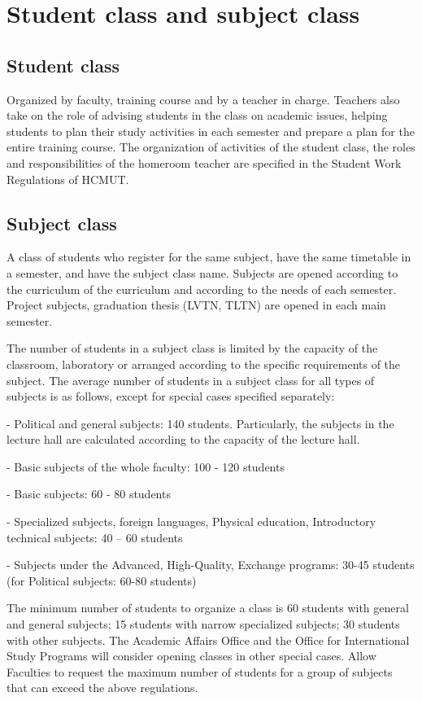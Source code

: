 \section{Student class and subject class}
\subsection{Student class}
Organized by faculty, training course and by a teacher in charge. Teachers also take on the role of advising students in the class on academic issues, helping students to plan their study activities in each semester and prepare a plan for the entire training course. The organization of activities of the student class, the roles and responsibilities of the homeroom teacher are specified in the Student Work Regulations of HCMUT.

\subsection{Subject class}
A class of students who register for the same subject, have the same timetable in a semester, and have the subject class name. Subjects are opened according to the curriculum of the curriculum and according to the needs of each semester. Project subjects, graduation thesis (LVTN, TLTN) are opened in each main semester.

The number of students in a subject class is limited by the capacity of the classroom, laboratory or arranged according to the specific requirements of the subject. The average number of students in a subject class for all types of subjects is as follows, except for special cases specified separately:

- Political and general subjects: 140 students. Particularly, the subjects in the lecture hall are calculated according to the capacity of the lecture hall.

- Basic subjects of the whole faculty: 100 - 120 students

- Basic subjects: 60 - 80 students

- Specialized subjects, foreign languages, Physical education, Introductory technical subjects: 40 – 60 students

- Subjects under the Advanced, High-Quality, Exchange programs: 30-45 students (for Political subjects: 60-80 students)

The minimum number of students to organize a class is 60 students with general and general subjects; 15 students with narrow specialized subjects; 30 students with other subjects. The Academic Affairs Office and the Office for International Study Programs will consider opening classes in other special cases. Allow Faculties to request the maximum number of students for a group of subjects that can exceed the above regulations.

